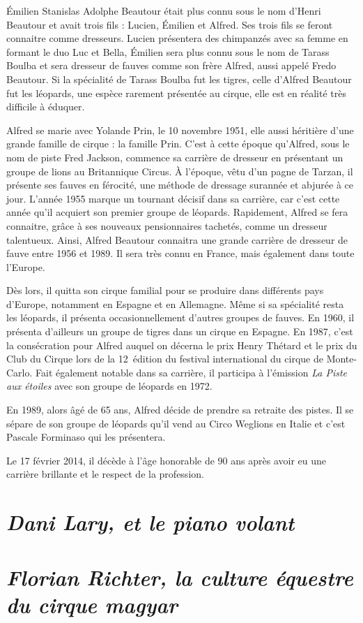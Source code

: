 Émilien Stanislas Adolphe Beautour était plus connu sous le nom d’Henri Beautour et avait trois fils : Lucien, Émilien et Alfred. Ses trois fils se feront connaitre comme dresseurs. Lucien présentera des chimpanzés avec sa femme en formant le duo Luc et Bella, Émilien sera plus connu sous le nom de Tarass Boulba et sera dresseur de fauves comme son frère Alfred, aussi appelé Fredo Beautour. Si la spécialité de Tarass Boulba fut les tigres, celle d’Alfred Beautour fut les léopards, une espèce rarement présentée au cirque, elle est en réalité très difficile à éduquer.

Alfred se marie avec Yolande Prin, le 10 novembre 1951, elle aussi héritière d’une grande famille de cirque : la famille Prin. C’est à cette époque qu’Alfred, sous le nom de piste Fred Jackson, commence sa carrière de dresseur en présentant un groupe de lions au Britannique Circus. À l’époque, vêtu d’un pagne de Tarzan, il présente ses fauves en férocité, une méthode de dressage surannée et abjurée à ce jour. L'année 1955 marque un tournant décisif dans sa carrière, car c’est cette année qu’il acquiert son premier groupe de léopards. Rapidement, Alfred se fera connaitre, grâce à ses nouveaux pensionnaires tachetés, comme un dresseur talentueux. Ainsi, Alfred Beautour connaitra une grande carrière de dresseur de fauve entre 1956 et 1989. Il sera très connu en France, mais également dans toute l’Europe.

Dès lors, il quitta son cirque familial pour se produire dans différents pays d’Europe, notamment en Espagne et en Allemagne. Même si sa spécialité resta les léopards, il présenta occasionnellement d’autres groupes de fauves. En 1960, il présenta d’ailleurs un groupe de tigres dans un cirque en Espagne. En 1987, c’est la consécration pour Alfred auquel on décerna le prix Henry Thétard et le prix du Club du Cirque lors de la 12\ieme~édition du festival international du cirque de Monte-Carlo. Fait également notable dans sa carrière, il participa à l’émission \textit{La Piste aux étoiles} avec son groupe de léopards en 1972.

En 1989, alors âgé de 65 ans, Alfred décide de prendre sa retraite des pistes. Il se sépare de son groupe de léopards qu’il vend au Circo Weglions en Italie et c’est Pascale Forminaso qui les présentera.

Le 17 février 2014, il décède à l’âge honorable de 90 ans après avoir eu une carrière brillante et le respect de la profession.

\section*{\textit{Dani Lary, et le piano volant}}
{}


\section*{\textit{Florian Richter, la culture équestre du cirque magyar}}
{}

\thispagestyle{empty} %

